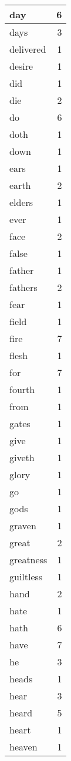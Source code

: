 \begin{center}
\begin{longtable}{l|r}
day & 6 \\ \hline
days & 3 \\ \hline
delivered & 1 \\ \hline
desire & 1 \\ \hline
did & 1 \\ \hline
die & 2 \\ \hline
do & 6 \\ \hline
doth & 1 \\ \hline
down & 1 \\ \hline
ears & 1 \\ \hline
earth & 2 \\ \hline
elders & 1 \\ \hline
ever & 1 \\ \hline
face & 2 \\ \hline
false & 1 \\ \hline
father & 1 \\ \hline
fathers & 2 \\ \hline
fear & 1 \\ \hline
field & 1 \\ \hline
fire & 7 \\ \hline
flesh & 1 \\ \hline
for & 7 \\ \hline
fourth & 1 \\ \hline
from & 1 \\ \hline
gates & 1 \\ \hline
give & 1 \\ \hline
giveth & 1 \\ \hline
glory & 1 \\ \hline
go & 1 \\ \hline
gods & 1 \\ \hline
graven & 1 \\ \hline
great & 2 \\ \hline
greatness & 1 \\ \hline
guiltless & 1 \\ \hline
hand & 2 \\ \hline
hate & 1 \\ \hline
hath & 6 \\ \hline
have & 7 \\ \hline
he & 3 \\ \hline
heads & 1 \\ \hline
hear & 3 \\ \hline
heard & 5 \\ \hline
heart & 1 \\ \hline
heaven & 1 \\ \hline

\end{longtable}
\end{center}
